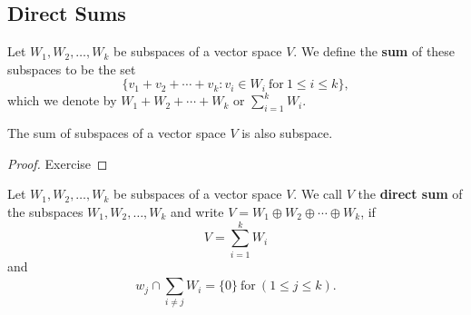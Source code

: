 \subsection{Direct Sums}

\begin{definition}
    Let \( {W}_{1}, {W}_{2}, \dots, {W}_{k} \) be subspaces of a vector space \( V  \). We define the \textbf{sum} of these subspaces to be the set 
    \[  \{ {v}_{1} + {v}_{2} + \cdots + {v}_{k } : {v}_{i} \in {W}_{i} \ \text{for} \ 1 \leq i \leq k  \}, \]
    which we denote by \( {W}_{1} + {W}_{2} + \cdots + {W}_{k} \) or \( \sum_{ i=1 }^{ k  } {W}_{i} \).
\end{definition}

\begin{prop}
    The sum of subspaces of a vector space \( V  \) is also subspace.
\end{prop}

\begin{proof}
Exercise
\end{proof}

\begin{definition}
    Let \( {W}_{1}, {W}_{2}, \dots, {W}_{k} \) be subspaces of a vector space \( V  \). We call \( V  \) the \textbf{direct sum} of the subspaces \( {W}_{1}, {W}_{2}, \dots, {W}_{k } \) and write \( V = {W}_{1} \oplus {W}_{2} \oplus \cdots \oplus {W}_{k} \), if 
    \[  V = \sum_{ i=1  }^{  k  } {W}_{i} \]
    and 
    \[  {w}_{j} \cap \sum_{ i \neq j  }^{  }{W}_{i} = \{ 0  \} \ \text{for} \ (1 \leq j \leq k ). \]
\end{definition}

